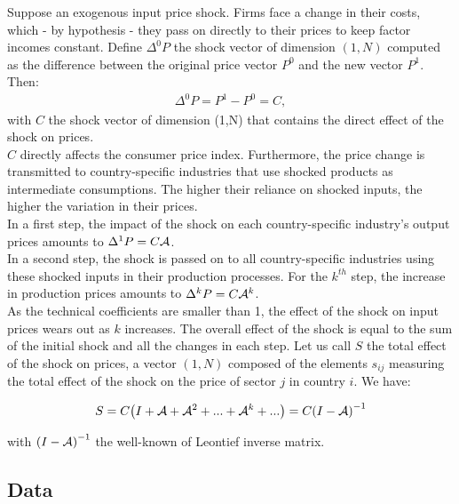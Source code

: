 \documentclass[11pt,a4paper]{article}
\begin{document}
Suppose an exogenous input price shock. Firms face a change in their costs, which - by hypothesis - they pass on directly to their prices to keep factor incomes constant.
Define ${{\Delta }^{0}}P$ the shock vector of dimension $(1, N)$ computed as the difference between the original price vector $P^0$ and the new  vector $P^1$. Then:
\begin{eqnarray*}
\Delta ^{0}P=P^1-P^0=C, 
\end{eqnarray*}
with $C$ the shock vector of dimension (1,N) that contains the direct effect of the shock on prices.\\
$C$ directly affects the consumer price index.
Furthermore, the price change is transmitted to country-specific industries that use shocked products as intermediate consumptions. The higher their reliance on shocked inputs, the higher the variation in their prices.\\
In a first step, the impact of the shock on each country-specific industry's output prices amounts to $\Delta^{1}P=C{\cal A}$.\\
In a second step, the shock is passed on to all country-specific industries using these shocked inputs in their production processes. For the $k^{th}$ step, the increase in production prices amounts to $\Delta^k P=C{\cal A}^k$.\\
As the technical coefficients are smaller than 1, the effect of the shock on input prices wears out as $k$ increases.
The overall effect of the shock is equal to the sum of the initial shock and all the changes in each step.
Let us call $S$ the total effect of the shock on prices, a vector $(1, N)$ composed of the elements $s_{ij}$ measuring the total effect of the shock on the price of sector $j$ in country $i$. We have: 

\begin{eqnarray}
S=C {\left( I+{\cal A}+{\cal A}^2+...+{\cal A}^k+...\right)} =C {\left( I-{\cal A} \right)}^{-1}
\label{eq:eqchocprix} 
\end{eqnarray}


with ${\left( I-{\cal A} \right)}^{-1}$ the well-known of Leontief inverse matrix.

\subsection{Data}
\label{subsec:data}
\end{document}
